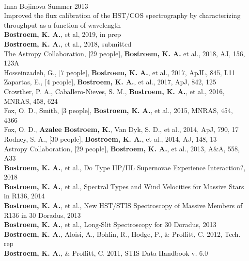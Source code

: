 \documentclass[10pt]{cv}
\begin{document}
\begin{llist}
\\
Inna Bojinova \hfill Summer 2013\\
Improved the flux calibration of the HST/COS spectrography by characterizing  
throughput as a function of wavelength\\
%
\vspace{-0.1in}  
{\bf Bostroem, K. A.}, et al, 2019, in prep\\
{\bf Bostroem, K. A.}, et al., 2018, submitted\\
The Astropy Collaboration, [29 people], {\bf Bostroem, K. A.} et al., 2018, AJ, 156, 123A\\
Hosseinzadeh, G., [7 people], {\bf Bostroem, K. A.}, et al., 2017, ApJL, 845, L11\\
Zapartas, E., [4 people], {\bf Bostroem, K. A.}, et al., 2017, ApJ, 842, 125\\
Crowther, P. A., Caballero-Nieves, S. M., {\bf Bostroem, K. A.}, et al., 2016, MNRAS, 458, 624\\
Fox, O. D., Smith, [3 people], {\bf Bostroem, K. A.}, et al., 2015, MNRAS, 454, 4366\\
Fox, O. D., {\bf Azalee Bostroem, K.}, Van Dyk, S. D., et al., 2014, ApJ, 790, 17\\
Rodney, S. A., [30 people], {\bf Bostroem, K. A.}, et al., 2014, AJ, 148, 13\\
Astropy Collaboration, [29 people], {\bf Bostroem, K. A.}, et al., 2013, A\&A, 558, A33 \\
%
\vspace{-0.1in}   
{\bf Bostroem, K. A.}, et al., Do Type IIP/IIL Supernovae Experience Interaction?, 2018\\
{\bf Bostroem, K. A.}, et al., Spectral Types and Wind Velocities for Massive Stars in R136, 2014\\
{\bf Bostroem, K. A.}, et al., New HST/STIS Spectroscopy of Massive Members of R136 in 30 Doradus, 2013\\
{\bf Bostroem, K. A.}, et al., Long-Slit Spectroscopy for 30 Doradus, 2013\\
{\bf Bostroem, K. A.}, Aloisi, A., Bohlin, R., Hodge, P., \& Proffitt, C. 2012, Tech. rep \\
{\bf Bostroem, K. A.}, \& Proffitt, C. 2011, STIS Data Handbook v. 6.0\\

\end{llist}
\end{document}
